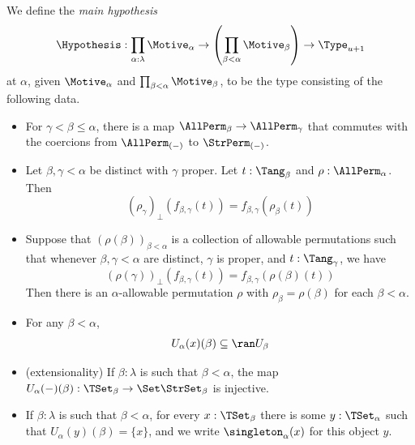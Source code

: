\begin{definition}
  \label{def:MainHypothesis}
  We define the \emph{main hypothesis}
  \[ \Hypothesis : \prod_{\alpha : \lambda} \Motive_\alpha \to \left( \prod_{\beta < \alpha} \Motive_\beta \right) \to \Type_{u+1} \]
  at \( \alpha \), given \( \Motive_\alpha \) and \( \prod_{\beta < \alpha} \Motive_\beta \), to be the type consisting of the following data.
  \begin{itemize}
    \item For \( \gamma < \beta \leq \alpha \), there is a map \( \AllPerm_\beta \to \AllPerm_\gamma \) that commutes with the coercions from \( \AllPerm_{(-)} \) to \( \StrPerm_{(-)} \).
    \item Let \( \beta, \gamma < \alpha \) be distinct with \( \gamma \) proper.
    Let \( t : \Tang_\beta \) and \( \rho : \AllPerm_\alpha \).
    Then
    \[ (\rho_\gamma)_\bot(f_{\beta,\gamma}(t)) = f_{\beta,\gamma}(\rho_\beta(t)) \]
    \item Suppose that \( (\rho(\beta))_{\beta < \alpha} \) is a collection of allowable permutations such that whenever \( \beta, \gamma < \alpha \) are distinct, \( \gamma \) is proper, and \( t : \Tang_\gamma \), we have
    \[ (\rho(\gamma))_\bot(f_{\beta,\gamma}(t)) = f_{\beta,\gamma}(\rho(\beta)(t)) \]
    Then there is an \( \alpha \)-allowable permutation \( \rho \) with \( \rho_\beta = \rho(\beta) \) for each \( \beta < \alpha \).
    \item For any \( \beta < \alpha \),
    \[ U_\alpha(x)(\beta) \subseteq \ran U_\beta \]
    \item (extensionality) If \( \beta : \lambda \) is such that \( \beta < \alpha \), the map \( U_\alpha(-)(\beta) : \TSet_\beta \to \Set \StrSet_\beta \) is injective.
    \item If \( \beta : \lambda \) is such that \( \beta < \alpha \), for every \( x : \TSet_\beta \) there is some \( y : \TSet_\alpha \) such that \( U_\alpha(y)(\beta) = \{ x \} \), and we write \( \singleton_\alpha(x) \) for this object \( y \).
  \end{itemize}
\end{definition}
